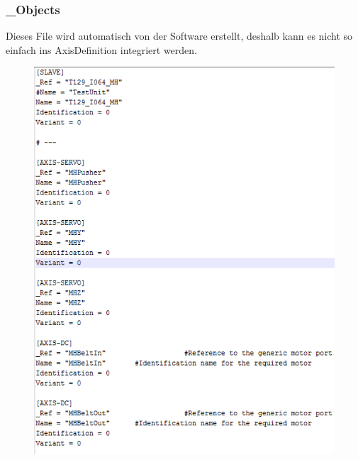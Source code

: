 		\subsubsection{\_Objects}
			Dieses File wird automatisch von der Software erstellt, deshalb kann es nicht so einfach ins AxisDefinition integriert werden.
			\begin{figure}[!h]
				\centering
				\includegraphics[width=0.8\linewidth]{./pics/ccp/_objects.png}
				\caption{}
				\label{}
			\end{figure}
